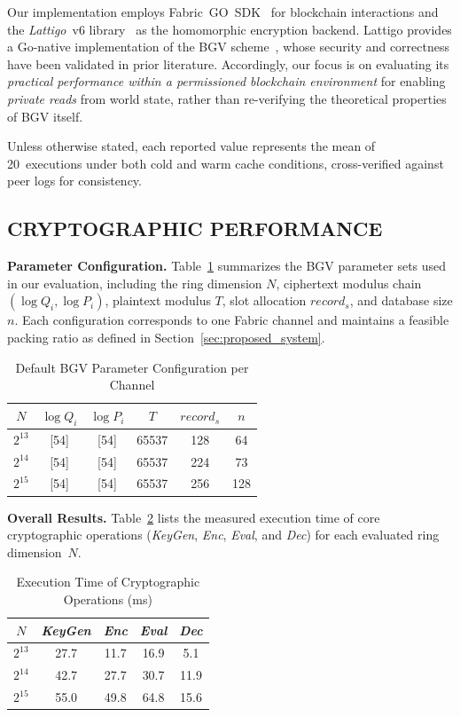 \documentclass[letterpaper,journal]{IEEEtran}
\begin{document}
Our implementation employs Fabric~GO~SDK~\cite{fabric_gateway_pkg_client_nodate} for blockchain interactions and
the \emph{Lattigo}~v6 library~\cite{noauthor_lattigo_2024} as the homomorphic encryption backend.
Lattigo provides a Go-native implementation of the BGV scheme~\cite{cryptoeprint:2011/277},
whose security and correctness have been validated in prior literature. 
Accordingly, our focus is on evaluating its \emph{practical performance within a permissioned blockchain environment} for 
enabling \emph{private reads} from world state, rather than re-verifying the theoretical properties of BGV itself.

Unless otherwise stated, each reported value represents the mean of 20~executions under both cold and warm cache conditions, 
cross-verified against peer logs for consistency.

\subsection{CRYPTOGRAPHIC PERFORMANCE}

\noindent\textbf{Parameter Configuration.}
Table~\ref{tab:params} summarizes the BGV parameter sets used in our evaluation, 
including the ring dimension $N$, ciphertext modulus chain $(\log Q_i, \log P_i)$, 
plaintext modulus $T$, slot allocation $record_s$, and database size $n$. 
Each configuration corresponds to one Fabric channel and maintains a feasible 
packing ratio as defined in Section~\ref{sec:proposed_system}.

\begin{table}[!htbp]
\caption{Default BGV Parameter Configuration per Channel}
\label{tab:params}
\centering
\begin{tabular}{|c|c|c|c|c|c|}
\hline
$N$ & $\log Q_i$ & $\log P_i$ & $T$ & $record_s$ & $n$  \\
\hline
$2^{13}$ & [54] & [54] & 65537 & 128 & 64 \\
$2^{14}$ & [54] & [54] & 65537 & 224 & 73 \\
$2^{15}$ & [54] & [54] & 65537 & 256 & 128 \\
\hline
\end{tabular}
\end{table}

\noindent\textbf{Overall Results.}
Table~\ref{tab:crypto-times} lists the measured execution time of core cryptographic operations 
(\emph{KeyGen}, \emph{Enc}, \emph{Eval}, and \emph{Dec}) for each evaluated ring dimension~$N$. 
\begin{table}[!htbp]
  \caption{Execution Time of Cryptographic Operations (ms)}
  \label{tab:crypto-times}
  \centering
  \begin{tabular}{|c|c|c|c|c|}
  \hline
  $N$ & \emph{KeyGen} & \emph{Enc} & \emph{Eval} & \emph{Dec} \\
  \hline
  $2^{13}$ & 27.7 & 11.7 & 16.9 & 5.1 \\
  $2^{14}$ & 42.7 & 27.7 & 30.7 & 11.9 \\
  $2^{15}$ & 55.0 & 49.8 & 64.8 & 15.6 \\
  \hline
  \end{tabular}
\end{table}
\end{document}

